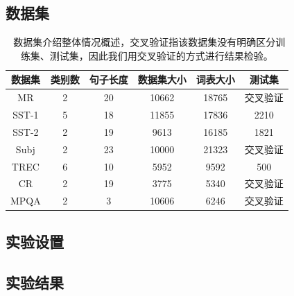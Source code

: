 \subsection{数据集}
\begin{table}[!t]
\centering
\begin{tabular}{c c c c c c}
\hline
\bfseries 数据集 & 类别数 & 句子长度 & 数据集大小 & 词表大小  & 测试集\\
\hline
MR & 2 & 20 & 10662 & 18765 &  交叉验证\\
SST-1 & 5 & 18 & 11855 & 17836  & 2210\\
SST-2 & 2 & 19 & 9613 & 16185  & 1821\\
Subj & 2 & 23 & 10000 & 21323  & 交叉验证\\
TREC & 6 & 10 & 5952 & 9592  & 500\\
CR & 2 & 19 & 3775 & 5340  & 交叉验证\\
MPQA & 2 & 3 & 10606 & 6246 & 交叉验证\\
\hline
\end{tabular}
\caption{\ 数据集介绍整体情况概述，交叉验证指该数据集没有明确区分训练集、测试集，因此我们用交叉验证的方式进行结果检验。}
\label{table: dataset summary}
\end{table}


\subsection{实验设置}

\subsection{实验结果}

